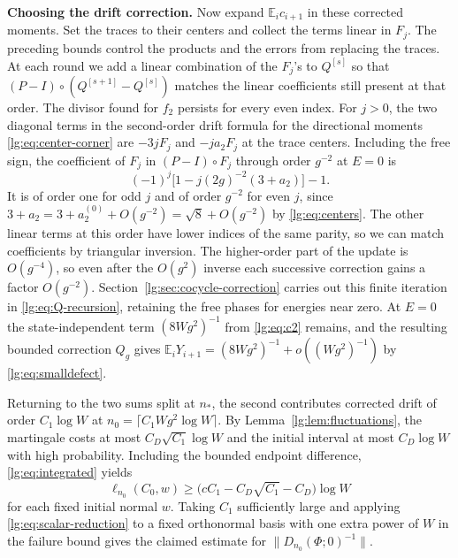 \documentclass[11pt]{article}
\numberwithin{equation}{section}
\theoremstyle{remark}
\newcommand{\E}{\mathbb E}
\begin{document}
\medskip\noindent\textbf{Choosing the drift correction.}
Now expand $\E_i c_{i+1}$ in these corrected moments. Set the traces
to their centers and collect the terms linear in $F_j$. The preceding
bounds control the products and the errors from replacing the traces.
At each round we add a linear combination of the $F_j$'s to $Q^{[s]}$
so that $(P-I)\circ(Q^{[s+1]}-Q^{[s]})$ matches the linear
coefficients still present at that order. The divisor found for $f_2$ persists for
every even index. For $j>0$, the two diagonal terms in the
second-order drift formula for the directional moments
\eqref{lg:eq:center-corner} are $-3jF_j$ and $-ja_2F_j$ at the
trace centers. Including the free sign, the coefficient of $F_j$ in
$(P-I)\circ F_j$ through order $g^{-2}$ at $E=0$ is
\[
 (-1)^j\bigl[1-j(2g)^{-2}(3+a_2)\bigr]-1 .
\]
It is of order one for odd $j$ and of order $g^{-2}$ for even $j$,
since $3+a_2=3+a_2^{(0)}+O(g^{-2})=\sqrt8+O(g^{-2})$
by \eqref{lg:eq:centers}. The other linear terms
at this order have lower indices of the same parity, so we can
match coefficients by triangular inversion. The higher-order part of
the update is $O(g^{-4})$, so even after the $O(g^2)$ inverse each
successive correction gains a factor $O(g^{-2})$.
Section~\ref{lg:sec:cocycle-correction} carries out this finite
iteration in \eqref{lg:eq:Q-recursion}, retaining the free phases
for energies near zero. At $E=0$ the state-independent term
$(8Wg^2)^{-1}$ from \eqref{lg:eq:c2} remains, and the resulting
bounded correction $Q_g$ gives
$\E_iY_{i+1}=(8Wg^2)^{-1}+o((Wg^2)^{-1})$ by \eqref{lg:eq:smalldefect}.

Returning to the two sums split at $n_*$, the second contributes
corrected drift of order $C_1\log W$ at $n_0=\lceil C_1Wg^2\log W\rceil$.
By Lemma~\ref{lg:lem:fluctuations}, the martingale costs at most
$C_D\sqrt{C_1}\log W$ and the initial interval at most $C_D\log W$
with high probability. Including the bounded endpoint difference,
\eqref{lg:eq:integrated} yields
\[
 \ell_{n_0}(C_0,w)\ge
 \bigl(cC_1-C_D\sqrt{C_1}-C_D\bigr)\log W
\]
for each fixed initial normal $w$. Taking $C_1$ sufficiently large
and applying \eqref{lg:eq:scalar-reduction} to a fixed orthonormal
basis with one extra power of $W$ in the failure bound gives the
claimed estimate for $\|D_{n_0}(\Phi;0)^{-1}\|$.
\end{document}
